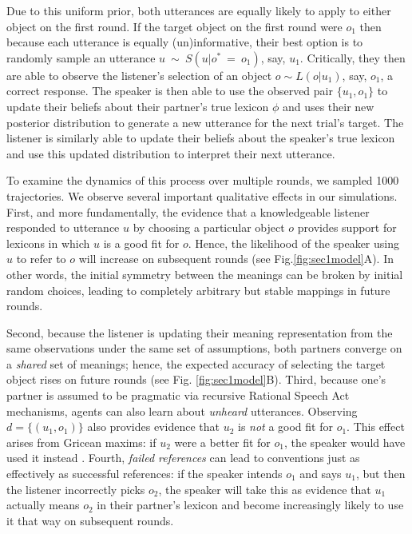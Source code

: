 Due to this uniform prior, both utterances are equally likely to apply to either object on the first round. 
If the target object on the first round were $o_1$ then because each utterance is equally (un)informative, their best option is to randomly sample an utterance $u~\sim~S(u|o^*~=~o_1)$, say, $u_1$.
Critically, they then are able to observe the listener's selection of an object $o \sim L(o | u_1)$, say, $o_1$, a correct response.
The speaker is then able to use the observed pair $\{u_1, o_1\}$ to update their beliefs about their partner's true lexicon $\phi$ and uses their new posterior distribution to generate a new utterance for the next trial's target.
The listener is similarly able to update their beliefs about the speaker's true lexicon and use this updated distribution to interpret their next utterance.

To examine the dynamics of this process over multiple rounds, we sampled 1000 trajectories.
We observe several important qualitative effects in our simulations. 
First, and more fundamentally, the evidence that a knowledgeable listener responded to utterance $u$ by choosing a particular object $o$ provides support for lexicons in which $u$ is a good fit for $o$. 
Hence, the likelihood of the speaker using $u$ to refer to $o$ will increase on subsequent rounds (see Fig.\ref{fig:sec1model}A). 
In other words, the initial symmetry between the meanings can be broken by initial random choices, leading to completely arbitrary but stable mappings in future rounds. 

Second, because the listener is updating their meaning representation from the same observations under the same set of assumptions, both partners converge on a \emph{shared} set of meanings; hence, the expected accuracy of selecting the target object rises on future rounds (see Fig. \ref{fig:sec1model}B). 
Third, because one's partner is assumed to be pragmatic via recursive Rational Speech Act mechanisms, agents can also learn about \emph{unheard} utterances. 
Observing $d = \{(u_1, o_1)\}$ also provides evidence that $u_2$ is \emph{not} a good fit for $o_1$.
This effect arises from Gricean maxims: if $u_2$ were a better fit for $o_1$, the speaker would have used it instead \cite{Grice75_LogicConversation}. 
Fourth, \emph{failed references} can lead to conventions just as effectively as successful references: if the speaker intends $o_1$ and says $u_1$, but then the listener incorrectly picks $o_2$, the speaker will take this as evidence that $u_1$ actually means $o_2$ in their partner's lexicon and become increasingly likely to use it that way on subsequent rounds.

